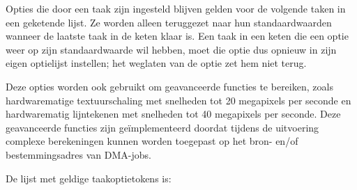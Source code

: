 Opties die door een taak zijn ingesteld blijven gelden voor de volgende taken in een geketende lijst. Ze worden alleen teruggezet naar hun standaardwaarden wanneer de laatste taak in de keten klaar is. Een taak in een keten die een optie weer op zijn standaardwaarde wil hebben, moet die optie dus opnieuw in zijn eigen optielijst instellen; het weglaten van de optie zet hem niet terug.

Deze opties worden ook gebruikt om geavanceerde functies te bereiken, zoals hardwarematige textuurschaling met snelheden tot 20 megapixels per seconde en hardwarematig lijntekenen met snelheden tot 40 megapixels per seconde. Deze geavanceerde functies zijn geïmplementeerd doordat tijdens de uitvoering complexe berekeningen kunnen worden toegepast op het bron- en/of bestemmingsadres van DMA-jobs.

De lijst met geldige taakoptietokens is:

